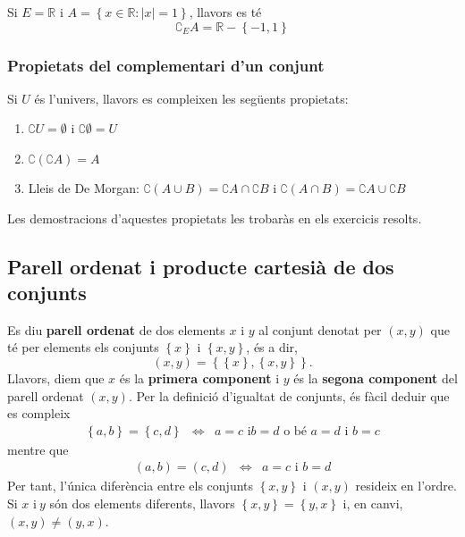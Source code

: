 \begin{exemple}
Si $E=\mathbb{R}$ i $A=\left\{ x\in\mathbb{R}:\left\vert x\right\vert
=1\right\} $, llavors es t\'{e}%
\begin{equation*}
\complement_{E}A=\mathbb{R}-\left\{ -1,1\right\}
\end{equation*}
\end{exemple}

\subsubsection{Propietats del complementari d'un conjunt}

Si $U$ \'{e}s l'univers, llavors es compleixen les seg\"{u}ents propietats:

\begin{enumerate}
\item $\complement U=\emptyset$ i $\complement\emptyset=U$

\item $\complement\left( \complement A\right) =A$

\item Lleis de De Morgan: $\complement\left( A\cup B\right) =\complement
A\cap\complement B$ i $\complement\left( A\cap B\right) =\complement
A\cup\complement B$
\end{enumerate}

Les demostracions d'aquestes propietats les trobar\`{a}s en els exercicis
resolts.

\subsection{Parell ordenat i producte cartesi\`{a} de dos conjunts}

Es diu \textbf{parell ordenat} de dos elements $x$ i $y$ al conjunt denotat
per $(x,y)$ que t\'{e} per elements els conjunts $\left\{ x\right\} $ i $%
\left\{ x,y\right\} $, \'{e}s a dir,%
\begin{equation*}
(x,y)=\left\{ \left\{ x\right\} ,\left\{ x,y\right\} \right\} \text{.}
\end{equation*}
Llavors, diem que $x$ \'{e}s la \textbf{primera component} i $y$ \'{e}s la
\textbf{segona component} del parell ordenat $(x,y)$. Per la definici\'{o}
d'igualtat de conjunts, \'{e}s f\`{a}cil deduir que es compleix%
\begin{equation*}
\begin{array}{ccc}
\left\{ a,b\right\} =\left\{ c,d\right\} & \Longleftrightarrow & a=c\text{ i
}b=d\text{ o b\'{e} }a=d\text{ i }b=c%
\end{array}
\end{equation*}
mentre que%
\begin{equation*}
\begin{array}{ccc}
(a,b)=(c,d) & \Longleftrightarrow & a=c\text{ i }b=d%
\end{array}
\end{equation*}
Per tant, l'\'{u}nica difer\`{e}ncia entre els conjunts $\left\{ x,y\right\}
$ i $(x,y)$ resideix en l'ordre. Si $x$ i$\ y$ s\'{o}n dos elements
diferents, llavors $\left\{ x,y\right\} =\left\{ y,x\right\} $ i, en canvi, $%
(x,y)\neq(y,x)$.

